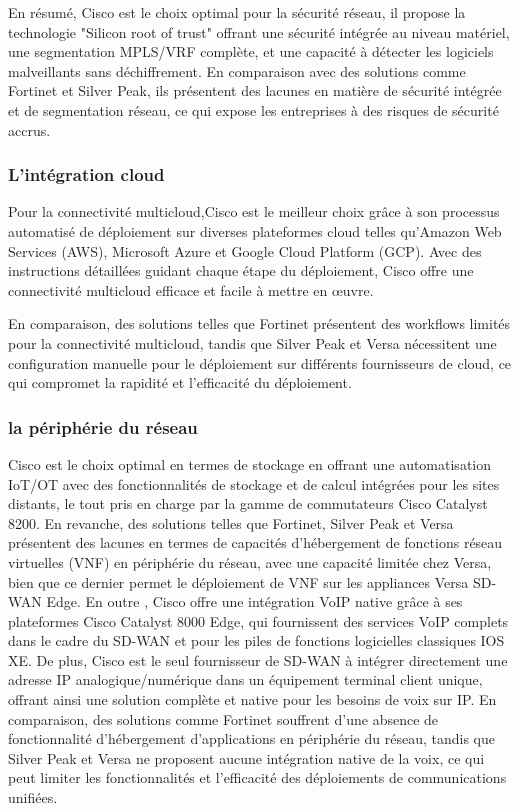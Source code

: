 En résumé, Cisco est le choix optimal pour la sécurité réseau, il propose la  technologie "Silicon root of trust" offrant une sécurité intégrée au niveau matériel, une segmentation MPLS/VRF complète, et une capacité à détecter les logiciels malveillants sans déchiffrement. En comparaison avec des solutions comme Fortinet et Silver Peak, ils  présentent des lacunes en matière de sécurité intégrée et de segmentation réseau, ce qui expose les entreprises à des risques de sécurité accrus.

\subsubsection{L'intégration cloud  }

Pour la connectivité multicloud,Cisco est le meilleur choix grâce à son processus automatisé de déploiement sur diverses plateformes cloud telles qu'Amazon Web Services (AWS), Microsoft Azure et Google Cloud Platform (GCP). Avec des instructions détaillées guidant chaque étape du déploiement, Cisco offre une connectivité multicloud efficace et facile à mettre en œuvre. 

En comparaison, des solutions telles que Fortinet présentent des workflows limités pour la connectivité multicloud, tandis que Silver Peak et Versa nécessitent une configuration manuelle pour le déploiement sur différents fournisseurs de cloud, ce qui compromet la rapidité et l'efficacité du déploiement.
\subsubsection{la périphérie du réseau  }

Cisco est le choix optimal en termes de stockage en offrant une automatisation IoT/OT avec des fonctionnalités de stockage et de calcul intégrées pour les sites distants, le tout pris en charge par la gamme de commutateurs Cisco Catalyst 8200. En revanche, des solutions telles que Fortinet, Silver Peak et Versa présentent des lacunes en termes de capacités d'hébergement de fonctions réseau virtuelles (VNF) en périphérie du réseau, avec une capacité limitée chez Versa, bien que ce dernier permet le déploiement de VNF sur les appliances Versa SD-WAN Edge.
En outre , Cisco offre  une intégration VoIP native grâce à ses plateformes Cisco Catalyst 8000 Edge, qui fournissent des services VoIP complets dans le cadre du SD-WAN et pour les piles de fonctions logicielles classiques IOS XE. De plus, Cisco est le seul fournisseur de SD-WAN à intégrer directement une adresse IP analogique/numérique dans un équipement terminal client unique, offrant ainsi une solution complète et native pour les besoins de voix sur IP. En comparaison, des solutions comme Fortinet souffrent d'une absence de fonctionnalité d'hébergement d'applications en périphérie du réseau, tandis que Silver Peak et Versa ne proposent aucune intégration native de la voix, ce qui peut limiter les fonctionnalités et l'efficacité des déploiements de communications unifiées.

